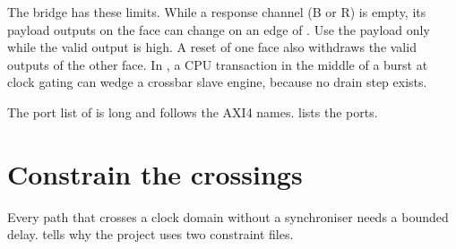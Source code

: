 \begin{warningbox}
The bridge  has these limits. While a response channel (B or R) is empty, its payload outputs on the  face can change on an edge of . Use the payload only while the valid output is high. A reset of one face also withdraws the valid outputs of the other face. In , a CPU transaction in the middle of a burst at clock gating can wedge a crossbar slave engine, because no drain step exists.
\end{warningbox}
The port list of  is long and follows the AXI4 names.  lists the ports.

\section{Constrain the crossings}\label{um:ch:cdc-integration:constrain}
Every path that crosses a clock domain without a synchroniser needs a bounded delay.  tells why the project uses two constraint files.


